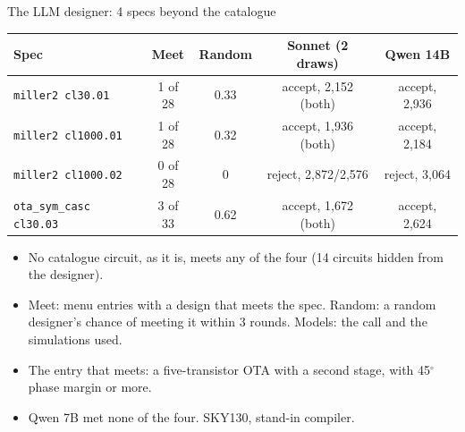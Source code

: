 \begin{frame}{The LLM designer: 4 specs beyond the catalogue}
  \centering\small\setlength{\tabcolsep}{4pt}
  \begin{tabular}{@{}lcccc@{}}
    \toprule
    Spec & Meet & Random & Sonnet (2 draws) & Qwen 14B \\
    \midrule
    \texttt{miller2 cl30.01}      & 1 of 28 & 0.33 & accept, 2,152 (both) & accept, 2,936 \\
    \texttt{miller2 cl1000.01}    & 1 of 28 & 0.32 & accept, 1,936 (both) & accept, 2,184 \\
    \texttt{miller2 cl1000.02}    & 0 of 28 & 0    & reject, 2,872/2,576 & reject, 3,064 \\
    \texttt{ota\_sym\_casc cl30.03} & 3 of 33 & 0.62 & accept, 1,672 (both) & accept, 2,624 \\
    \bottomrule
  \end{tabular}

  \vspace{3mm}
  \begin{minipage}{0.92\linewidth}\footnotesize
    \begin{itemize}
      \item No catalogue circuit, as it is, meets any of the four (14 circuits hidden from the designer).
      \item Meet: menu entries with a design that meets the spec. Random: a random designer's chance of meeting it
        within 3 rounds. Models: the call and the simulations used.
      \item The entry that meets: a five-transistor OTA with a second stage, with 45$^\circ$ phase margin or more.
      \item Qwen 7B met none of the four. SKY130, stand-in compiler.
    \end{itemize}
  \end{minipage}
\end{frame}

